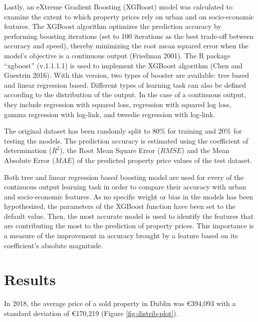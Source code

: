 \documentclass[conference,final,]{IEEEtran}
\begin{document}
Lastly, an eXtreme Gradient Boosting (XGBoost) model was calculated to examine the extent to which property prices rely on urban and on socio-economic features. The XGBoost algorithm optimizes the prediction accuracy by performing boosting iterations (set to 100 iterations as the best trade-off between accuracy and speed), thereby minimizing the root mean squared error when the model's objective is a continuous output (Friedman 2001). The R package ``xgboost'' (v.1.1.1.1) is used to implement the XGBoost algorithm (Chen and Guestrin 2016). With this version, two types of booster are available: tree based and linear regression based. Different types of learning task can also be defined according to the distribution of the output. In the case of a continuous output, they include regression with squared loss, regression with squared log loss, gamma regression with log-link, and tweedie regression with log-link.

The original dataset has been randomly split to 80\% for training and 20\% for testing the models. The prediction accuracy is estimated using the coefficient of determination (\(R^2\)), the Root Mean Square Error (\(RMSE\)) and the Mean Absolute Error (\(MAE\)) of the predicted property price values of the test dataset.

Both tree and linear regression based boosting model are used for every of the continuous output learning task in order to compare their accuracy with urban and socio-economic features. As no specific weight or bias in the models has been hypothesized, the parameters of the XGBoost function have been set to the default value. Then, the most accurate model is used to identify the features that are contributing the most to the prediction of property prices. This importance is a measure of the improvement in accuracy brought by a feature based on its coefficient's absolute magnitude.

\hypertarget{results}{%
\section{Results}\label{results}}

In 2018, the average price of a sold property in Dublin was €394,093 with a standard deviation of €170,219 (Figure \ref{fig:distrib-plot}).
\end{document}
